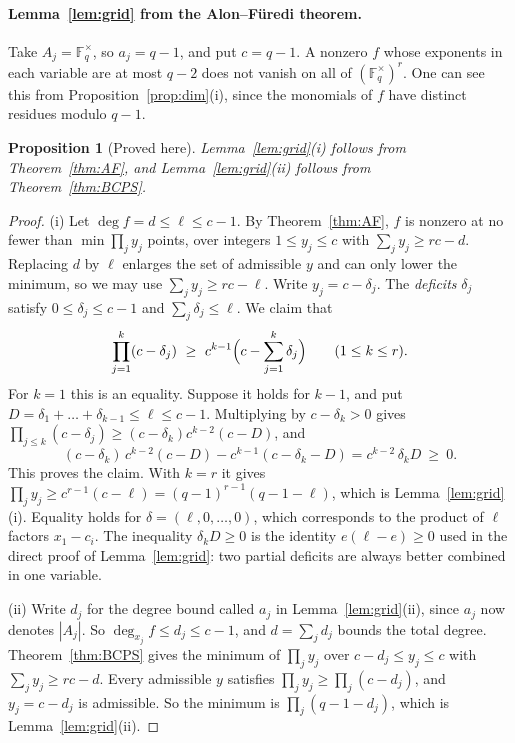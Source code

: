 \documentclass[12pt,letterpaper]{article}
\numberwithin{equation}{section}
\newtheorem{proposition}[theorem]{Proposition}
\theoremstyle{definition}
\theoremstyle{remark}
\newcommand{\Fqs}{\mathbb{F}_q^{\times}}
\begin{document}
\paragraph{Lemma~\ref{lem:grid} from the Alon--F\"uredi theorem.}
Take $A_j=\Fqs$, so $a_j=q-1$, and put $c=q-1$. A nonzero $f$ whose exponents
in each variable are at most $q-2$ does not vanish on all of $(\Fqs)^r$. One
can see this from Proposition~\ref{prop:dim}(i), since the monomials of $f$
have distinct residues modulo $q-1$.

\begin{proposition}[Proved here]\label{prop:AFgrid}
Lemma~\ref{lem:grid}(i) follows from Theorem~\ref{thm:AF}, and
Lemma~\ref{lem:grid}(ii) follows from Theorem~\ref{thm:BCPS}.
\end{proposition}

\begin{proof}
(i) Let $\deg f=d\le\ell\le c-1$. By Theorem~\ref{thm:AF}, $f$ is nonzero at
no fewer than $\min\prod_jy_j$ points, over integers $1\le y_j\le c$ with
$\sum_jy_j\ge rc-d$. Replacing $d$ by $\ell$ enlarges the set of admissible
$y$ and can only lower the minimum, so we may use $\sum_jy_j\ge rc-\ell$. Write $y_j=c-\delta_j$. The \emph{deficits}
$\delta_j$ satisfy $0\le\delta_j\le c-1$ and $\sum_j\delta_j\le\ell$. We claim
that
\[
\prod_{j=1}^k(c-\delta_j)\ \ge\ c^{k-1}\Bigl(c-\sum_{j=1}^k\delta_j\Bigr)
\qquad(1\le k\le r).
\]
For $k=1$ this is an equality. Suppose it holds for $k-1$, and put
$D=\delta_1+\dots+\delta_{k-1}\le\ell\le c-1$. Multiplying by $c-\delta_k>0$
gives $\prod_{j\le k}(c-\delta_j)\ge(c-\delta_k)c^{k-2}(c-D)$, and
\[
(c-\delta_k)\,c^{k-2}(c-D)-c^{k-1}(c-\delta_k-D)=c^{k-2}\,\delta_kD\ \ge\ 0 .
\]
This proves the claim. With $k=r$ it gives
$\prod_jy_j\ge c^{r-1}(c-\ell)=(q-1)^{r-1}(q-1-\ell)$, which is
Lemma~\ref{lem:grid}(i). Equality holds for $\delta=(\ell,0,\dots,0)$, which
corresponds to the product of $\ell$ factors $x_1-c_i$. The inequality
$\delta_kD\ge0$ is the identity $e(\ell-e)\ge0$ used in the direct proof of
Lemma~\ref{lem:grid}: two partial deficits are always better combined in one
variable.

(ii) Write $d_j$ for the degree bound called $a_j$ in
Lemma~\ref{lem:grid}(ii), since $a_j$ now denotes $|A_j|$. So
$\deg_{x_j}f\le d_j\le c-1$, and $d=\sum_jd_j$ bounds the total degree. Theorem~\ref{thm:BCPS} gives the minimum of $\prod_jy_j$
over $c-d_j\le y_j\le c$ with $\sum_jy_j\ge rc-d$. Every admissible $y$
satisfies $\prod_jy_j\ge\prod_j(c-d_j)$, and $y_j=c-d_j$ is admissible. So
the minimum is $\prod_j(q-1-d_j)$, which is Lemma~\ref{lem:grid}(ii).
\end{proof}
\end{document}
